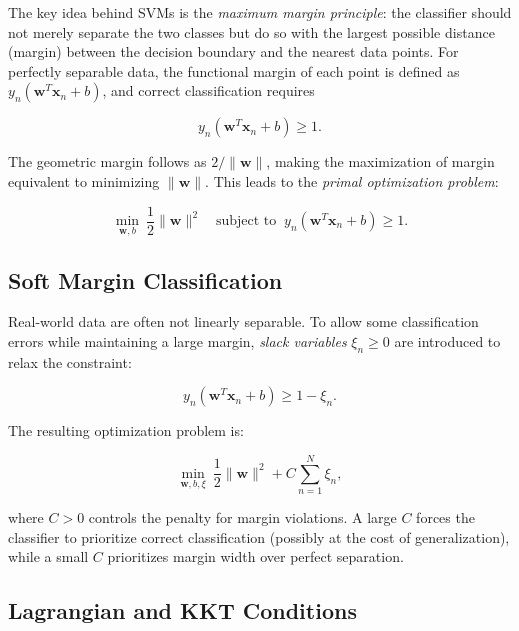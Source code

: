 \documentclass[conference]{IEEEtran}
\begin{document}
	The key idea behind SVMs is the \textit{maximum margin principle}: the classifier should not merely separate the two classes but do so with the largest possible distance (margin) between the decision boundary and the nearest data points. For perfectly separable data, the functional margin of each point is defined as $y_n(\mathbf{w}^T \mathbf{x}_n + b)$, and correct classification requires
	
	\begin{equation}
		y_n(\mathbf{w}^T \mathbf{x}_n + b) \ge 1.
	\end{equation}
	
	The geometric margin follows as $2/\|\mathbf{w}\|$, making the maximization of margin equivalent to minimizing $\|\mathbf{w}\|$. This leads to the \textit{primal optimization problem}:
	
	\begin{equation}
		\min_{\mathbf{w}, b} \ \frac{1}{2}\|\mathbf{w}\|^2 \quad \text{subject to } \ y_n(\mathbf{w}^T \mathbf{x}_n + b) \ge 1.
	\end{equation}
	
	\subsection{Soft Margin Classification}
	
	Real-world data are often not linearly separable. To allow some classification errors while maintaining a large margin, \textit{slack variables} $\xi_n \ge 0$ are introduced to relax the constraint:
	
	\begin{equation}
		y_n(\mathbf{w}^T \mathbf{x}_n + b) \ge 1 - \xi_n.
	\end{equation}
	
	The resulting optimization problem is:
	
	\begin{equation}
		\min_{\mathbf{w}, b, \xi} \ \frac{1}{2}\|\mathbf{w}\|^2 + C \sum_{n=1}^N \xi_n,
		\label{eq:soft_primal}
	\end{equation}
	
	where $C > 0$ controls the penalty for margin violations. A large $C$ forces the classifier to prioritize correct classification (possibly at the cost of generalization), while a small $C$ prioritizes margin width over perfect separation.
	
	\subsection{Lagrangian and KKT Conditions}
	
\end{document}
